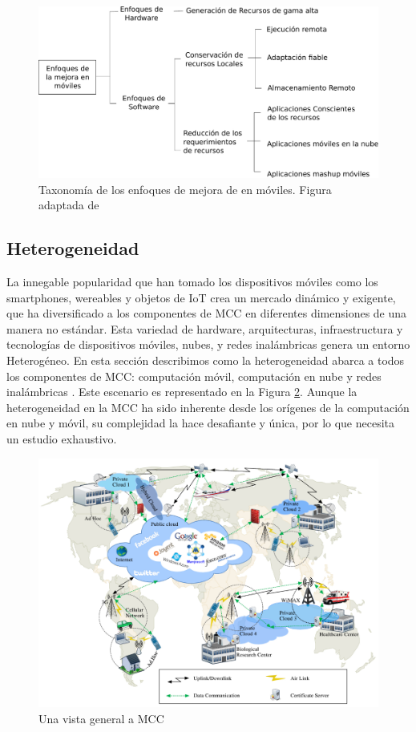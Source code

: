\begin{figure}[h]
 \includegraphics[scale=0.35]{Figures/taxonomySmartphone.pdf}
 \caption{Taxonomía de los enfoques de mejora de en móviles. Figura adaptada de \cite{abolfazli2012mobile}}
 \label{fig:approachesmobileaugmentation}
\end{figure}

\subsection{Heterogeneidad}

La innegable popularidad que han tomado los dispositivos móviles como los smartphones, wereables y objetos de IoT crea un mercado dinámico
y exigente, que ha diversificado a los componentes de MCC en diferentes dimensiones de una manera no estándar. Esta variedad de hardware, arquitecturas,
infraestructura y tecnologías de dispositivos móviles, nubes, y redes inalámbricas genera un entorno Heterogéneo. En esta sección
describimos como la heterogeneidad abarca a todos los componentes de MCC: computación móvil, computación en nube y redes inalámbricas
\cite{sanaei2014heterogeneity}. Este
escenario es representado en la Figura \ref{fig:mccheterogeinity}. Aunque la heterogeneidad en la MCC ha sido inherente desde los orígenes
de la computación en nube y móvil, su complejidad la hace desafiante y única, por lo que necesita un estudio exhaustivo.


\begin{figure}[h]
 \includegraphics[scale=0.45]{Figures/mccheterogeinity}
 \caption{Una vista general a MCC \cite{sanaei2014heterogeneity}}
 \label{fig:mccheterogeinity}
\end{figure}


